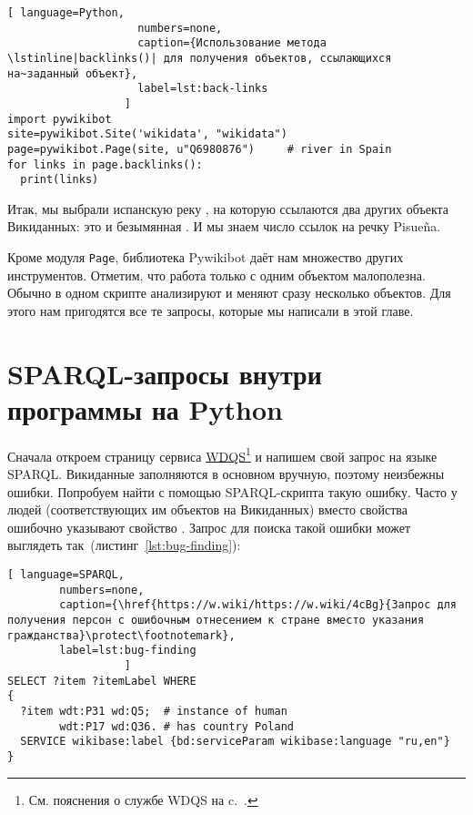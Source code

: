 \newpage
\begin{lstlisting}[ language=Python,
                    numbers=none,
                    caption={Использование метода \lstinline|backlinks()| для получения объектов, ссылающихся на~заданный объект},
                    label=lst:back-links
                  ]
import pywikibot
site=pywikibot.Site('wikidata', "wikidata")
page=pywikibot.Page(site, u"Q6980876")     # river in Spain
for links in page.backlinks():
  print(links)
\end{lstlisting}

Итак, мы выбрали испанскую реку , на которую ссылаются 
два других объекта Викиданных: это  и безымянная . 
И мы знаем число ссылок на речку Pisueña. 


Кроме модуля \lstinline|Page|, 
библиотека Pywikibot даёт нам множество других инструментов. 
Отметим, что работа только с одним объектом малополезна. 
Обычно в одном скрипте анализируют и меняют сразу несколько объектов. 
Для этого нам пригодятся все те запросы, которые мы написали в этой главе.


\section{SPARQL-запросы внутри программы на Python}
\label{sec:running queries}

Сначала откроем страницу сервиса \href{https://query.wikidata.org/}{WDQS}\footnote[][0pt]{%
См. пояснения о службе WDQS на c.~\pageref{sect:WDQS}.%
}%
 и напишем свой запрос на языке SPARQL. 
Викиданные заполняются в основном вручную, поэтому неизбежны ошибки. 
Попробуем найти с помощью SPARQL-скрипта такую ошибку. 
Часто у людей (соответствующих им объектов на Викиданных) 
вместо свойства  
ошибочно указывают свойство . 
Запрос для поиска такой ошибки может выглядеть так~(листинг~\ref{lst:bug-finding}):

\begin{lstlisting}[ language=SPARQL,
        numbers=none,
        caption={\href{https://w.wiki/https://w.wiki/4cBg}{Запрос для получения персон с ошибочным отнесением к стране вместо указания гражданства}\protect\footnotemark},
        label=lst:bug-finding
                  ]
SELECT ?item ?itemLabel WHERE 
{
  ?item wdt:P31 wd:Q5;  # instance of human
        wdt:P17 wd:Q36. # has country Poland
  SERVICE wikibase:label {bd:serviceParam wikibase:language "ru,en"}
}
\end{lstlisting}

